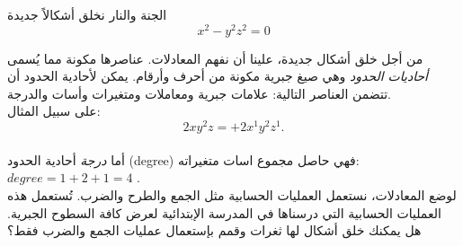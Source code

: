 \begin{surferPage}{الجنة والنار}
نخلق أشكالاً جديدة \\
\smallskip
\[x^2	- y^2z^2	= 0\]

\singlespacing
من أجل خلق أشكال جديدة، علينا أن نفهم المعادلات. عناصرها مكونة مما يُسمى \textit{أحاديات الحدود} وهي صيغ جبرية مكونة من أحرف وأرقام.
\singlespacing
يمكن لأحادية الحدود أن تتضمن العناصر التالية:
علامات جبرية ومعاملات ومتغيرات وأسات والدرجة.\\
\singlespacing
على سبيل المثال: 
\smallskip
\[2xy^2z = +2x^1y^2z^1.\]
\\
\smallskip
 أما\textit{ درجة} أحادية الحدود (degree) فهي حاصل مجموع اسات متغيراته: $degree = 1+2+1=4$ .  \\ 
\singlespacing
لوضع المعادلات، نستعمل العمليات الحسابية مثل الجمع والطرح والضرب. تُستعمل هذه العمليات الحسابية التي درسناها في المدرسة الإبتدائية لعرض كافة السطوح الجبرية.
\singlespacing
هل يمكنك خلق أشكال لها ثغرات وقمم بإستعمال عمليات الجمع والضرب فقط؟
\end{surferPage}